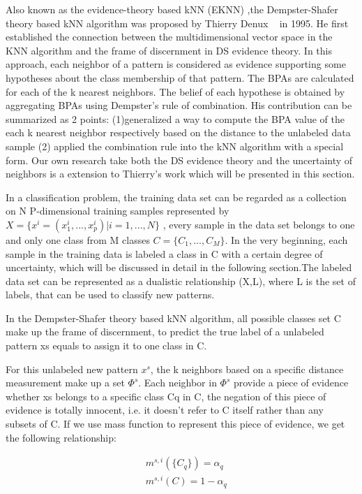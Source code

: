 \documentclass[runningheads]{llncs}
\begin{document}
Also known as the evidence-theory based kNN (EKNN) ,the Dempster-Shafer theory based kNN algorithm was proposed by Thierry Denux ~\cite{ref_article3} in 1995. He first established the connection between the multidimensional vector space in the KNN algorithm and the frame of discernment in DS evidence theory. In this approach, each neighbor of a pattern is considered as evidence supporting some hypotheses about the class membership of that pattern. The BPAs are calculated for each of the k nearest neighbors. The belief of each hypothese is obtained by aggregating BPAs using Dempster’s rule of combination. His contribution can be summarized as 2 points: (1)generalized a way to compute the BPA value of  the each k nearest neighbor respectively based on the distance to the unlabeled data sample (2) applied the combination rule into the kNN algorithm with a special form. Our own research take both the DS evidence theory and the uncertainty of neighbors is a extension to Thierry's work which will be presented in this section.

In a classification problem, the training data set can be regarded as a collection on N P-dimensional training samples represented by $X=\{x^i=(x_1^i,...,x_p^i)|i=1,...,N\}$  , every sample in the data set belongs to one and only one class from M classes $C=\{C_1,...,C_M\}$. In the very beginning, each sample in the training data is labeled a class in C with a certain degree of uncertainty, which will be discussed in detail in the following section.The labeled data set can be represented as a dualistic relationship (X,L), where L is the set of labels, that can be used to classify new patterns.

In the Dempster-Shafer theory based kNN algorithm, all possible classes set C make up the frame of discernment, to predict the true label of a unlabeled pattern xs equals to assign it to one class in C.

For this unlabeled new pattern $x^s$, the k neighbors based on a specific distance measurement make up a set $\Phi^s$. Each neighbor in $\Phi^s$ provide a piece of evidence whether xs belongs to a specific class Cq in C, the negation of this piece of evidence is totally innocent, i.e. it doesn't refer to  C itself rather than any subsets of C. If we use mass function to represent this piece of evidence, we get the following relationship:

\begin{equation}
\begin{split}
&\ m^{s,i}( \{C_q\}) = \alpha_q
\\
&\ m^{s,i}(C) = 1-\alpha_q
\end{split}
\end{equation}
\end{document}
